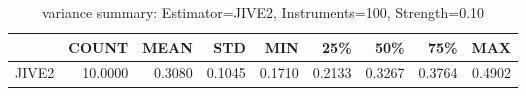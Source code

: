 \begin{table}[ht]
\centering
\caption{variance summary: Estimator=JIVE2, Instruments=100, Strength=0.10}
\begin{tabular}{lrrrrrrrr}
\toprule
 & COUNT & MEAN & STD & MIN & 25\% & 50\% & 75\% & MAX \\
\midrule
JIVE2 & 10.0000 & 0.3080 & 0.1045 & 0.1710 & 0.2133 & 0.3267 & 0.3764 & 0.4902 \\
\bottomrule
\end{tabular}
\end{table}
